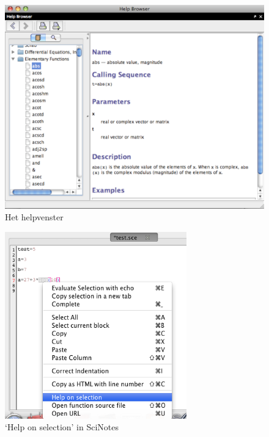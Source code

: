 \begin{figure}[h!t]
   \begin{center}
    \includegraphics[width=\textwidth]{figuren/scilab/05helpvenster}
  \caption{Het helpvenster}
	\label{fig:helpvenster}
	\end{center}
\end{figure}

\begin{figure}[htbp]
\centering
\includegraphics[width=0.7\textwidth]{figuren/scilab/05bhelp_in_scinotes}
\caption{`Help on selection' in SciNotes}
\label{fig:helpOnSelection}
\end{figure}

